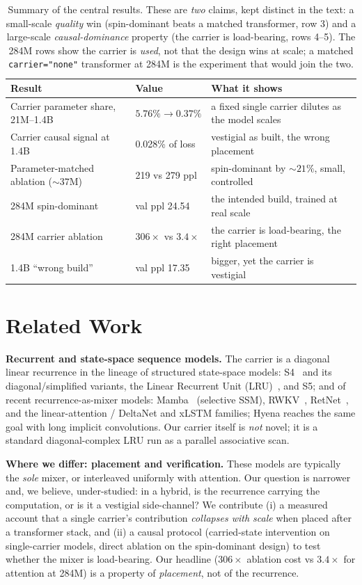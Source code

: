\documentclass[11pt]{article}
\newcommand{\code}[1]{\texttt{#1}}
\begin{document}
\begin{table}[t]\centering\small
\caption{Summary of the central results. These are \emph{two} claims, kept distinct in the text: a small-scale \emph{quality} win (spin-dominant beats a matched transformer, row 3) and a large-scale \emph{causal-dominance} property (the carrier is load-bearing, rows 4--5). The 284M rows show the carrier is \emph{used}, not that the design wins at scale; a matched \code{carrier="none"} transformer at 284M is the experiment that would join the two.}
\begin{tabular}{@{}p{6.2cm} l p{5.4cm}@{}}
\toprule
Result & Value & What it shows \\
\midrule
Carrier parameter share, 21M--1.4B & $5.76\% \to 0.37\%$ & a fixed single carrier dilutes as the model scales \\
Carrier causal signal at 1.4B & 0.028\% of loss & vestigial as built, the wrong placement \\
Parameter-matched ablation (${\sim}37$M) & 219 vs 279 ppl & spin-dominant by ${\sim}21\%$, small, controlled \\
284M spin-dominant & val ppl 24.54 & the intended build, trained at real scale \\
284M carrier ablation & $306\times$ vs $3.4\times$ & the carrier is load-bearing, the right placement \\
1.4B ``wrong build'' & val ppl 17.35 & bigger, yet the carrier is vestigial \\
\bottomrule
\end{tabular}
\end{table}

\section{Related Work}
\textbf{Recurrent and state-space sequence models.} The carrier is a diagonal linear recurrence in the lineage of structured state-space models: S4~\cite{gu2022s4} and its diagonal/simplified variants, the Linear Recurrent Unit (LRU)~\cite{orvieto2023lru}, and S5; and of recent recurrence-as-mixer models: Mamba~\cite{gu2023mamba} (selective SSM), RWKV~\cite{peng2023rwkv}, RetNet~\cite{sun2023retnet}, and the linear-attention / DeltaNet and xLSTM families; Hyena reaches the same goal with long implicit convolutions. Our carrier itself is \emph{not} novel; it is a standard diagonal-complex LRU run as a parallel associative scan.

\textbf{Where we differ: placement and verification.} These models are typically the \emph{sole} mixer, or interleaved uniformly with attention. Our question is narrower and, we believe, under-studied: in a hybrid, is the recurrence carrying the computation, or is it a vestigial side-channel? We contribute (i) a measured account that a single carrier's contribution \emph{collapses with scale} when placed after a transformer stack, and (ii) a causal protocol (carried-state intervention on single-carrier models, direct ablation on the spin-dominant design) to test whether the mixer is load-bearing. Our headline ($306\times$ ablation cost vs $3.4\times$ for attention at 284M) is a property of \emph{placement}, not of the recurrence.
\end{document}

